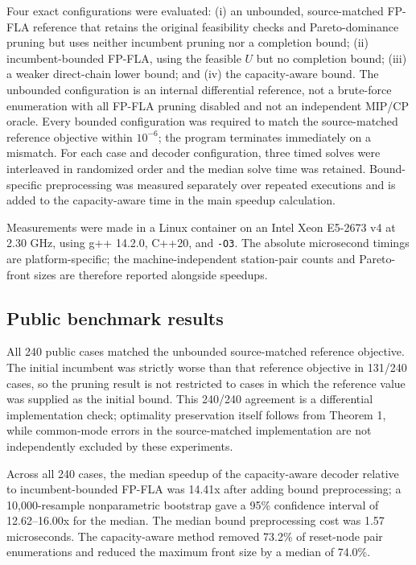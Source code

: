 \documentclass[11pt]{article}
\begin{document}
Four exact configurations were evaluated: (i) an unbounded, source-matched FP-FLA reference that retains the original feasibility checks and Pareto-dominance pruning but uses neither incumbent pruning nor a completion bound; (ii) incumbent-bounded FP-FLA, using the feasible $U$ but no completion bound; (iii) a weaker direct-chain lower bound; and (iv) the capacity-aware bound. The unbounded configuration is an internal differential reference, not a brute-force enumeration with all FP-FLA pruning disabled and not an independent MIP/CP oracle. Every bounded configuration was required to match the source-matched reference objective within $10^{-6}$; the program terminates immediately on a mismatch. For each case and decoder configuration, three timed solves were interleaved in randomized order and the median solve time was retained. Bound-specific preprocessing was measured separately over repeated executions and is added to the capacity-aware time in the main speedup calculation.

Measurements were made in a Linux container on an Intel Xeon E5-2673 v4 at 2.30 GHz, using g++ 14.2.0, C++20, and \texttt{-O3}. The absolute microsecond timings are platform-specific; the machine-independent station-pair counts and Pareto-front sizes are therefore reported alongside speedups.

\subsection{Public benchmark results}
All 240 public cases matched the unbounded source-matched reference objective. The initial incumbent was strictly worse than that reference objective in 131/240 cases, so the pruning result is not restricted to cases in which the reference value was supplied as the initial bound. This 240/240 agreement is a differential implementation check; optimality preservation itself follows from Theorem 1, while common-mode errors in the source-matched implementation are not independently excluded by these experiments.

Across all 240 cases, the median speedup of the capacity-aware decoder relative to incumbent-bounded FP-FLA was 14.41x after adding bound preprocessing; a 10,000-resample nonparametric bootstrap gave a 95\% confidence interval of 12.62--16.00x for the median. The median bound preprocessing cost was 1.57 microseconds. The capacity-aware method removed 73.2\% of reset-node pair enumerations and reduced the maximum front size by a median of 74.0\%.
\end{document}
